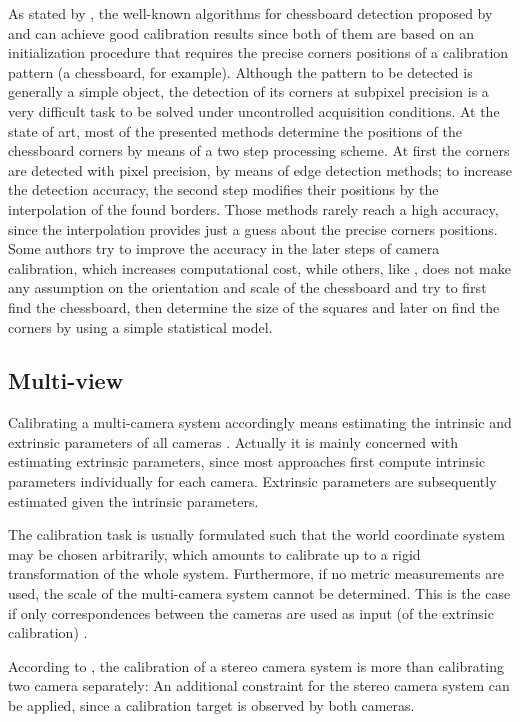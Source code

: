 \documentclass[msc, a4paper, classic, en]{ufbathesis}
\begin{document}
As stated by \cite{arca}, the well-known algorithms for chessboard detection proposed by \cite{Tsai86} and \cite{zhang2000flexible} can achieve good calibration results since both of them are based on an initialization procedure that requires the precise corners positions of a calibration pattern (a chessboard, for example). Although the pattern to be detected is generally a simple object, the detection of its corners at subpixel precision is a very difficult task to be solved under uncontrolled acquisition conditions. At the state of art, most of the presented methods determine the positions of the chessboard corners by means of a two step processing scheme. At first the corners are detected with pixel precision, by means of edge detection methods; to increase the detection accuracy, the second step modifies their positions by the interpolation of the found borders. Those methods rarely reach a high accuracy, since the interpolation provides just a guess about the precise corners positions. Some authors try to improve the accuracy in the later steps of camera calibration, which increases computational cost, while others, like \cite{arca}, does not make any assumption on the orientation and scale of the chessboard and try to first find the chessboard, then determine the size of the squares and later on find the corners by using a simple statistical model.

\subsection{Multi-view}

Calibrating a multi-camera system accordingly means estimating the intrinsic and extrinsic parameters of all cameras \cite{bajramovic2010self}. Actually it is mainly concerned with estimating extrinsic parameters, since most approaches first compute intrinsic parameters individually for each camera. Extrinsic parameters are subsequently estimated given the intrinsic parameters.

The calibration task is usually formulated such that the world coordinate system may be chosen arbitrarily, which amounts to calibrate up to a rigid transformation of the whole system. Furthermore, if no metric measurements are used, the scale of the multi-camera system cannot be determined. This is the case if only correspondences between the cameras are used as input (of the extrinsic calibration) \cite{bajramovic2010self}.

According to \cite{hanning2011high}, the calibration of a stereo camera system is more than calibrating two camera separately: An additional constraint for the stereo camera system can be applied, since a calibration target is observed by both cameras.
\end{document}
